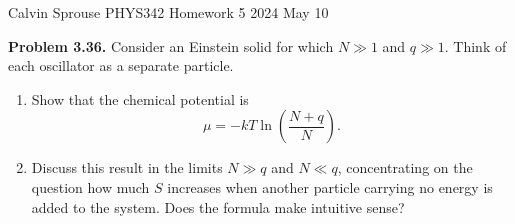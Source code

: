 \documentclass[a4paper, 12pt]{config/homework}
\begin{document}
\noindent
Calvin Sprouse \hfill PHYS342 Homework 5 \hfill 2024 May 10

\bigskip\noindent
\textbf{Problem 3.36.} Consider an Einstein solid for which \(N\gg 1\) and \(q\gg 1\). Think of each oscillator as a separate particle.
\begin{enumerate}[label=\textbf{(\alph*)}]
\item Show that the chemical potential is
\[\mu = - kT\ln\left(\frac{N+q}{N}\right).\]
\item Discuss this result in the limits \(N \gg q\) and \(N \ll q\), concentrating on the question how much \(S\) increases when another particle carrying no energy is added to the system. Does the formula make intuitive sense?
\end{enumerate}
\bigskip
\end{document}
